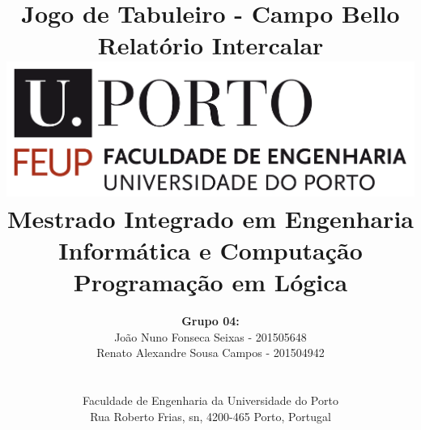 \documentclass[a4paper]{article}
\begin{document}
\setlength{\textwidth}{16cm}
\setlength{\textheight}{22cm}

\title{\Huge\textbf{Jogo de Tabuleiro - Campo Bello}\linebreak\linebreak\linebreak
\Large\textbf{Relatório Intercalar}\linebreak\linebreak
\linebreak\linebreak
\includegraphics[scale=0.1]{feup-logo.png}\linebreak\linebreak
\linebreak\linebreak
\Large{Mestrado Integrado em Engenharia Informática e Computação} \linebreak\linebreak
\Large{Programação em Lógica}\linebreak
}

\author{\textbf{Grupo 04:}\\
João Nuno Fonseca Seixas - 201505648 \\
Renato Alexandre Sousa Campos - 201504942\\
\linebreak\linebreak \\
 \\ Faculdade de Engenharia da Universidade do Porto \\ Rua Roberto Frias, s\/n, 4200-465 Porto, Portugal \linebreak\linebreak\linebreak
\linebreak\linebreak\vspace{1cm}}

\maketitle
\thispagestyle{empty}
\end{document}
